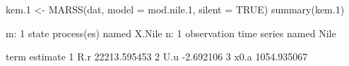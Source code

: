 \begin{Schunk}
\begin{Sinput}
 kem.1 <- MARSS(dat, model = mod.nile.1, silent = TRUE)
 summary(kem.1)
\end{Sinput}
\begin{Soutput}
m: 1 state process(es) named X.Nile
n: 1 observation time series named Nile

  term     estimate
1  R.r 22213.595453
2  U.u    -2.692106
3 x0.a  1054.935067
\end{Soutput}
\end{Schunk}
